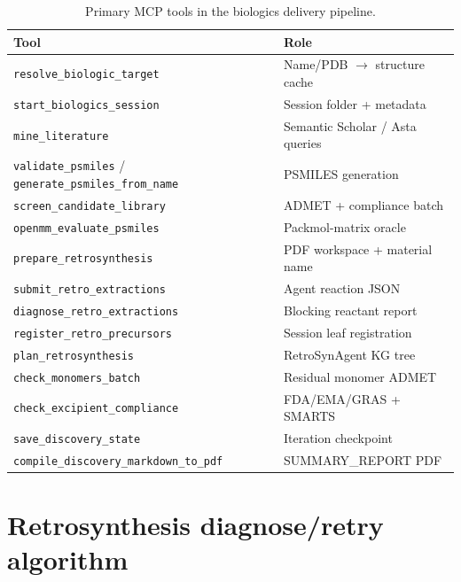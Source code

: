 \documentclass[twocolumn]{fairmeta}
\begin{document}
\begin{table}[h]
\centering
\caption{Primary MCP tools in the biologics delivery pipeline.}
\label{tab:mcp}
\scriptsize
\begin{tabularx}{\columnwidth}{lX}
\toprule
Tool & Role \\
\midrule
\texttt{resolve\_biologic\_target} & Name/PDB $\to$ structure cache \\
\texttt{start\_biologics\_session} & Session folder + metadata \\
\texttt{mine\_literature} & Semantic Scholar / Asta queries \\
\texttt{validate\_psmiles} / \texttt{generate\_psmiles\_from\_name} & PSMILES generation \\
\texttt{screen\_candidate\_library} & ADMET + compliance batch \\
\texttt{openmm\_evaluate\_psmiles} & Packmol-matrix oracle \\
\texttt{prepare\_retrosynthesis} & PDF workspace + material name \\
\texttt{submit\_retro\_extractions} & Agent reaction JSON \\
\texttt{diagnose\_retro\_extractions} & Blocking reactant report \\
\texttt{register\_retro\_precursors} & Session leaf registration \\
\texttt{plan\_retrosynthesis} & RetroSynAgent KG tree \\
\texttt{check\_monomers\_batch} & Residual monomer ADMET \\
\texttt{check\_excipient\_compliance} & FDA/EMA/GRAS + SMARTS \\
\texttt{save\_discovery\_state} & Iteration checkpoint \\
\texttt{compile\_discovery\_markdown\_to\_pdf} & SUMMARY\_REPORT PDF \\
\bottomrule
\end{tabularx}
\end{table}

\section{Retrosynthesis diagnose/retry algorithm}
\label{app:retro}
\end{document}
